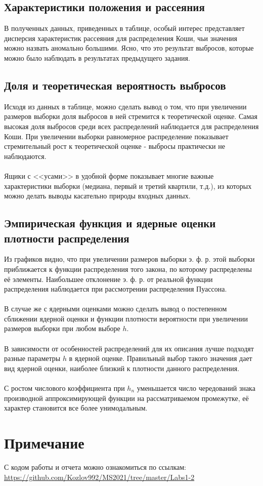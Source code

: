 \documentclass[a4paper]{article}
\begin{document}
\subsection{Характеристики положения и рассеяния}
В полученных данных, приведенных в таблице, особый интерес представляет дисперсия характеристик рассеяния для распределения Коши, чьи значения можно назвать аномально большими. Ясно, что это результат выбросов, которые можно было наблюдать в результатах предыдущего задания.
\subsection{Доля и теоретическая вероятность выбросов}
Исходя из данных в таблице, можно сделать вывод о том, что при увеличении размеров выборки доля выбросов в ней стремится к теоретической оценке. Самая высокая доля выбросов среди всех распределений наблюдается для распределения Коши. При увеличении выборки равномерное распределение показывает стремительный рост к теоретической оценке - выбросы практически не наблюдаются.\\\\
Ящики с <<усами>> в удобной форме показывает многие важные характеристики выборки (медиана, первый и третий квартили, т.д.), из которых можно делать выводы касательно природы входных данных.
\subsection{Эмпирическая функция и ядерные оценки плотности распределения}
Из графиков видно, что при увеличении размеров выборки э. ф. р. этой выборки приближается к функции распределения того закона, по которому распределены её элементы. Наибольшее отклонение э. ф. р. от реальной функции распределения наблюдается при рассмотрении распределения Пуассона.\\\\
В случае же с ядерными оценками можно сделать вывод о постепенном сближении ядерной оценки и функции плотности вероятности при увеличении размеров выборки при любом выборе $h$.\\\\
В зависимости от особенностей распределений для их описания лучше подходят разные параметры $h$ в ядерной оценке. Правильный выбор такого значения дает вид ядерной оценки, наиболее близкий к плотности данного распределения.\\\\
С ростом числового коэффициента при $h_n$ уменьшается число чередований знака производной аппроксимирующей функции на рассматриваемом промежутке, её характер становится все более унимодальным.
\section*{Примечание}
С кодом работы и отчета можно ознакомиться по ссылкам:\\\url{https://github.com/Kozlov992/MS2021/tree/master/Labs1-2}
\end{document}
